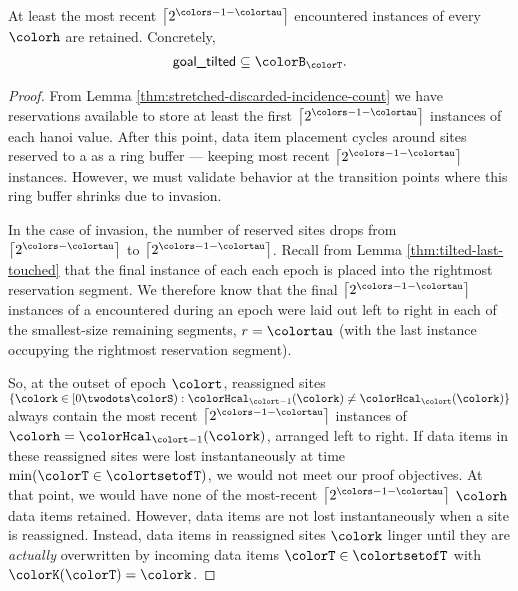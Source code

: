 \begin{lemma}
\label{thm:tilted-most-recent-retained}
At least the most recent $\left\lceil2^{\colors - 1 - \colortau}\right\rceil$ encountered instances of every \hv{} $\colorh$ are retained.
Concretely,
\begin{align*}
\textsf{goal\_tilted} \subseteq \colorB_{\colorT}.
\end{align*}
\end{lemma}
\begin{proof}
From Lemma \ref{thm:stretched-discarded-incidence-count} we have reservations available to store at least the first $\left\lceil 2^{\colors - 1 - \colortau} \right\rceil$ instances of each hanoi value.
After this point, data item placement cycles around sites reserved to a \hv as a ring buffer --- keeping most recent $\left\lceil 2^{\colors - 1 - \colortau} \right\rceil$ instances.
However, we must validate behavior at the transition points where this ring buffer shrinks due to invasion.

In the case of invasion, the number of reserved sites drops from $\left\lceil 2^{\colors - \colortau} \right\rceil$ to $\left\lceil 2^{\colors - 1 - \colortau} \right\rceil$.
Recall from Lemma \ref{thm:tilted-last-touched} that the final instance of each \hv{} each epoch is placed into the rightmost reservation segment.
We therefore know that the final $\left\lceil 2^{\colors - 1 - \colortau} \right\rceil$ instances of a \hv{} encountered during an epoch were laid out left to right in each of the smallest-size remaining segments, $r = \colortau$ (with the last instance occupying the rightmost reservation segment).

So, at the outset of epoch $\colort$, reassigned sites $\{\colork \in [0\twodots\colorS) : \colorHcal_{\colort - 1}(\colork) \neq \colorHcal_{\colort}(\colork)\}$ always contain the most recent $\left\lceil 2^{\colors - 1 - \colortau} \right\rceil$ instances of \hv{} $\colorh = \colorHcal_{\colort - 1}(\colork)$, arranged left to right.
If data items in these reassigned sites were lost instantaneously at time $\min(\colorT \in \colortsetofT)$, we would not meet our proof objectives.
At that point, we would have none of the most-recent $\left\lceil 2^{\colors - 1 - \colortau} \right\rceil$ \hv{} $\colorh$ data items retained.
However, data items are not lost instantaneously when a site is reassigned.
Instead, data items in reassigned sites $\colork$ linger until they are \textit{actually} overwritten by incoming data items $\colorT \in \colortsetofT$ with $\colorK(\colorT) = \colork$.


\end{proof}
